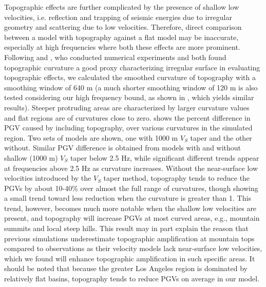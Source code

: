 Topographic effects are further complicated by the presence of shallow low velocities, i.e. reflection and trapping of seismic energies due to irregular geometry and scattering due to low velocities. Therefore, direct comparison between a model with topography against a flat model may be inaccurate, especially at high frequencies where both these effects are more prominent. Following \citet{maufroyFrequencyScaledCurvature2015} and \citet{raiEmpiricalTerrainBasedTopographic2017}, who conducted numerical experiments and both found topographic curvature a good proxy characterizing irregular surface in evaluating topographic effects, we calculated the smoothed curvature of topography with a smoothing window of 640 m (a much shorter smoothing window of 120 m is also tested considering our high frequency bound, as shown in , which yields similar results). Steeper protruding areas are characterized by larger curvature values and flat regions are of curvatures close to zero.  shows the percent difference in PGV caused by including topography, over various curvatures in the simulated region. Two sets of models are shown, one with 1000 m $V_S$ taper and the other without. Similar PGV difference is obtained from models with and without shallow (1000 m) $V_S$ taper below 2.5 Hz, while significant different trends appear at frequencies above 2.5 Hz as curvature increases. Without the near-surface low velocities introduced by the $V_S$ taper method, topography tends to reduce the PGVs by about 10-40\% over almost the full range of curvatures, though showing a small trend toward less reduction when the curvature is greater than 1. This trend, however, becomes much more notable when the shallow low velocities are present, and topography will increase PGVs at most curved areas, e.g., mountain summits and local steep hills. This result may in part explain the reason that previous simulations underestimate topographic amplification at mountain tops compared to observations  as their velocity models lack near-surface low velocities, which we found will enhance topographic amplification in such specific areas. It should be noted that because the greater Los Angeles region is dominated by relatively flat basins, topography tends to reduce PGVs on average in our model.


